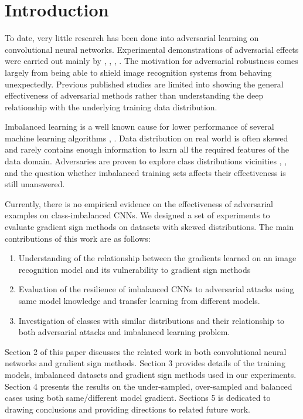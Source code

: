 \documentclass[runningheads,a4paper]{llncs}
\begin{document}
\section{Introduction}


To date, very little research has been done into adversarial learning on convolutional neural networks. Experimental demonstrations of adversarial effects were carried out mainly by \cite{billovits}, \cite{goodfellow2014}, \cite{goodfellow2016}, \cite{papernot2016}. The motivation for adversarial robustness comes largely from being able to shield image recognition systems from behaving unexpectedly. Previous published studies are limited into showing the general effectiveness of adversarial methods rather than understanding the deep relationship with the underlying training data distribution.

Imbalanced learning is a well known cause for lower performance of several machine learning algorithms \cite{japkowicz2002class}, \cite{krawczyk2016learning}. Data distribution on real world is often skewed and rarely contains enough information to learn all the required features of the data domain. Adversaries are proven to explore class distributions vicinities \cite{lowd2005}, \cite{Laskov2010}, and the question whether imbalanced training sets affects their effectiveness is still unanswered. 

Currently, there is no empirical evidence on the effectiveness of adversarial examples on class-imbalanced CNNs. We designed a set of experiments to evaluate gradient sign methods on datasets with skewed distributions. The main contributions of this work are as follows:
\begin{enumerate}
\item Understanding of the relationship between the gradients learned on an image recognition model and its vulnerability to gradient sign methods
\item Evaluation of the resilience of imbalanced CNNs to adversarial attacks using same model knowledge and transfer learning from different models.
\item Investigation of classes with similar distributions and their relationship to both adversarial attacks and imbalanced learning problem.
\end{enumerate}

Section 2 of this paper discusses the related work in both convolutional neural networks and gradient sign methods. Section 3 provides details of the training models, imbalanced datasets and gradient sign methods used in our experiments. Section 4 presents the results on the under-sampled, over-sampled and balanced cases using both same/different model gradient. Sections 5 is dedicated to drawing conclusions and providing directions to related future work.
\end{document}
